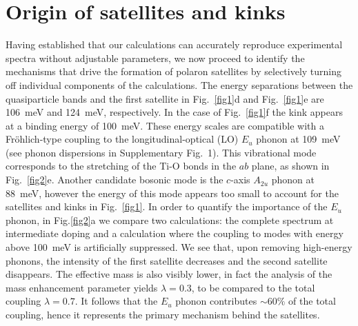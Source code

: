 \documentclass[12pt]{nature}
\begin{document}
\section*{\textsf{\small Origin of satellites and kinks}}

Having established that our calculations can accurately reproduce experimental spectra without 
adjustable parameters, we now proceed to identify the mechanisms that drive the formation of 
polaron satellites by selectively turning off individual components of the calculations. 
The energy separations between the quasiparticle bands and the first satellite in Fig.~\ref{fig1}d 
and Fig.~\ref{fig1}e are 106~meV and 124~meV, respectively. In the case of Fig.~\ref{fig1}f 
the kink appears at a binding energy of 100~meV. These energy scales are compatible with a 
Fr\"ohlich-type coupling to the longitudinal-optical (LO) $E_u$ phonon at 109~meV (see phonon 
dispersions in Supplementary Fig.~1). This vibrational mode corresponds to the stretching of 
the Ti-O bonds in the $ab$ plane, as shown in Fig.~\ref{fig2}e. Another candidate bosonic mode is 
the $c$-axis $A_{2u}$ phonon at 88~meV\cite{Moser2015}, however the energy of this mode appears too 
small to account for the satellites and kinks in Fig.~\ref{fig1}. In order to quantify the importance 
of the $E_u$ phonon, in Fig.\ref{fig2}a we compare two calculations: the complete spectrum at intermediate 
doping and a calculation where the coupling to modes with energy above 100~meV is 
artificially suppressed. We see that, upon removing high-energy phonons, the 
intensity of the first satellite decreases and the second satellite disappears. The effective mass is also 
visibly lower, in fact the analysis of the mass enhancement parameter yields $\lambda=0.3$, to be compared 
to the total coupling $\lambda=0.7$. It follows that the $E_u$ phonon contributes $\sim60\%$ of the total 
coupling, hence it represents the primary mechanism behind the satellites.
\end{document}
